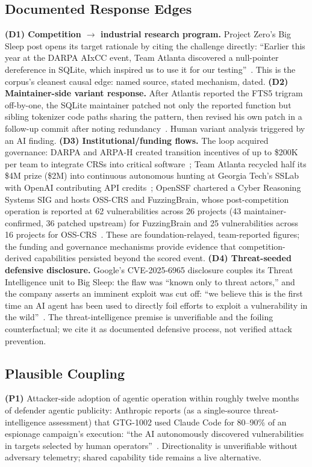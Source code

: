 \documentclass[conference,compsoc]{IEEEtran}
\begin{document}
\subsection{Documented Response Edges}
\textbf{(D1) Competition $\rightarrow$ industrial research program.} Project Zero's Big Sleep
post opens its target rationale by citing the challenge directly: ``Earlier this year at the
DARPA AIxCC event, Team Atlanta discovered a null-pointer dereference in SQLite, which inspired
us to use it for our testing''~\cite{bigsleep2024}. This is the corpus's cleanest causal
edge: named source, stated mechanism, dated.
\textbf{(D2) Maintainer-side variant response.} After Atlantis reported the FTS5 trigram
off-by-one, the SQLite maintainer patched not only the reported function but sibling tokenizer
code paths sharing the pattern, then revised his own patch in a follow-up commit after noting
redundancy~\cite{taasc2024}. Human variant analysis triggered by an AI finding.
\textbf{(D3) Institutional/funding flows.} The loop acquired governance: DARPA and ARPA-H
created transition incentives of up to \$200K per team to integrate CRSs into critical software~\cite{darparesults2025};
Team Atlanta recycled half its \$4M prize (\$2M) into continuous autonomous hunting at Georgia
Tech's SSLab with OpenAI contributing API credits~\cite{taafc2025}; OpenSSF chartered a Cyber
Reasoning Systems SIG and hosts OSS-CRS and FuzzingBrain, whose post-competition operation is
reported at 62 vulnerabilities across 26 projects (43 maintainer-confirmed, 36 patched upstream)
for FuzzingBrain and 25 vulnerabilities across 16 projects for OSS-CRS~\cite{openssfaixcc2026}.
These are foundation-relayed, team-reported figures; the funding and governance mechanisms provide evidence that competition-derived capabilities persisted beyond the scored event.
\textbf{(D4) Threat-seeded defensive disclosure.} Google's CVE-2025-6965 disclosure couples its
Threat Intelligence unit to Big Sleep: the flaw was ``known only to threat actors,'' and the
company asserts an imminent exploit was cut off: ``we believe this is the first time an AI
agent has been used to directly foil efforts to exploit a vulnerability in the
wild''~\cite{bloggoogle2025,nvd6965}. The threat-intelligence premise is unverifiable and the
foiling counterfactual; we cite it as documented defensive process, not verified attack
prevention.

\subsection{Plausible Coupling}
\textbf{(P1)} Attacker-side adoption of agentic operation within roughly twelve months of
defender agentic publicity: Anthropic reports (as a single-source threat-intelligence assessment) that GTG-1002 used Claude Code for 80--90\% of an
espionage campaign's execution: ``the AI autonomously discovered vulnerabilities in targets
selected by human operators''~\cite{anthropicgtgreport2025,anthropicgtg2025}. Directionality is
unverifiable without adversary telemetry; shared capability tide remains a live alternative.
\end{document}

